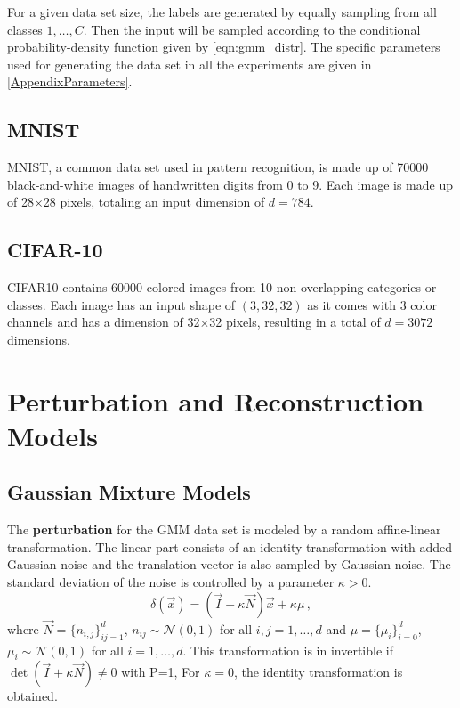 For a given data set size, the labels are generated by equally sampling from all classes $1, \ldots, C$.
Then the input will be sampled according to the conditional probability-density function given by \cref{eqn:gmm_distr}.
The specific parameters used for generating the data set in all the experiments
are given in \cref{AppendixParameters}.


\subsection{MNIST}
MNIST, a common data set used in pattern recognition, is made up of 70000 black-and-white images 
of handwritten digits from 0 to 9. 
Each image is made up of 28$\times$28 pixels, totaling an input dimension of $d=784$.

\subsection{CIFAR-10}
CIFAR10 contains 60000 colored images from 10 non-overlapping categories or classes.
Each image has an input shape of $(3, 32, 32)$ as it comes with 3 color channels 
and has a dimension of 32$\times$32 pixels, resulting in a total of $d=3072$ dimensions.





\section{Perturbation and Reconstruction Models}
\label{sec:reconstruction_models}


\subsection{Gaussian Mixture Models}

The \textbf{perturbation} for the GMM data set is modeled by
a random affine-linear transformation.
The linear part consists of an identity transformation with added Gaussian noise
and the translation vector is also sampled by Gaussian noise.
The standard deviation of the noise is controlled by a parameter $\kappa > 0$.
\[
    \delta(\vec x) = (\vec I + \kappa \vec N)\vec x + \kappa \mu \,,
\]
where $\vec N = \{n_{i, j}\}_{i j = 1}^{d}$, $n_{ij} \sim \mathcal N (0, 1)$ for all $i, j = 1 , \ldots, d$
and 
$\mu = \{\mu_i\}_{i=0}^d$, $\mu_i \sim \mathcal N(0, 1)$ for all $i=1,\ldots,d$.
This transformation is in invertible if $\det (\vec I + \kappa \vec N) \neq 0$ with P=1,
For $\kappa = 0$, the identity transformation is obtained.

